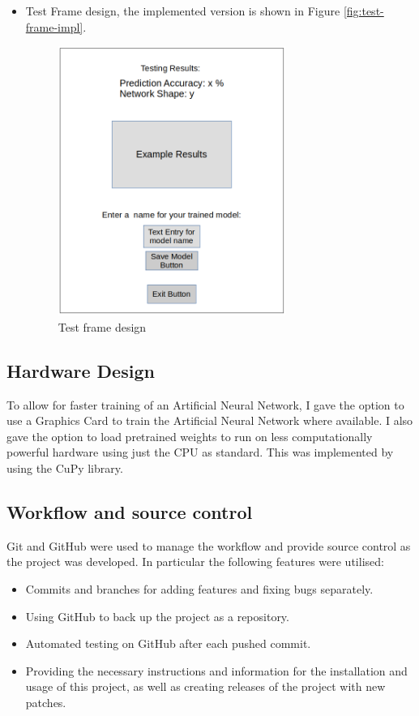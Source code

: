 \documentclass[./project-report/src/latex/project-report.tex]{subfiles}
\begin{document}
\begin{itemize}
    \pagebreak
    
    \item Test Frame design, the implemented version is shown in Figure \ref{fig:test-frame-impl}.
        \begin{figure}[h!]
        \centering
        \includegraphics[width=0.7\textwidth]{./project-report/src/images/testing-frame-design.png}
        \caption{Test frame design}
        \label{fig:testing-frame-design}
        \end{figure}
\end{itemize}

\subsection{Hardware Design}

To allow for faster training of an Artificial Neural Network, I gave the option to use a Graphics Card to train the Artificial Neural Network where available. I also gave the 
option to load pretrained weights to run on less computationally powerful hardware using just the CPU as standard. This was implemented by using the CuPy library.

\subsection{Workflow and source control}

Git and GitHub were used to manage the workflow and provide source control as the project was developed. In particular the following features were utilised:

\begin{itemize}
    \item Commits and branches for adding features and fixing bugs separately.
    \item Using GitHub to back up the project as a repository.
    \item Automated testing on GitHub after each pushed commit.
    \item Providing the necessary instructions and information for the installation and usage of this project, as well as creating releases of the project with new patches.
\end{itemize}
\end{document}
